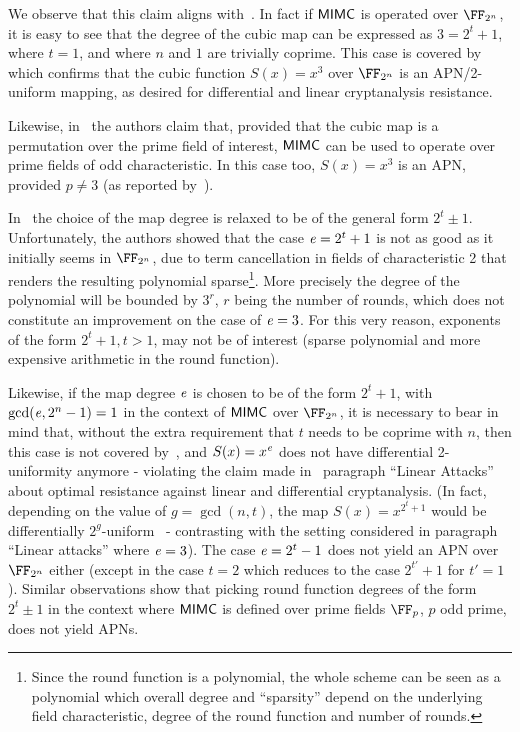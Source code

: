 We observe that this claim aligns with~\cite[Theorem 2]{DBLP:journals/tit/HellesethRS99}. In fact if $\mathsf{MIMC{}}$ is operated over $\FFx{2^n}$, it is easy to see that the degree of the cubic map can be expressed as $3 = 2^t + 1$, where $t = 1$, and where $n$ and $1$ are trivially coprime. This case is covered by~\cite[Theorem 2]{DBLP:journals/tit/HellesethRS99} which confirms that the cubic function $S(x) = x^3$ over $\FFx{2^n}$ is an APN/2-uniform mapping, as desired for differential and linear cryptanalysis resistance.

Likewise, in~\cite[Section 5.1]{albrecht2016mimc} the authors claim that, provided that the cubic map is a permutation over the prime field of interest, $\mathsf{MIMC{}}$ can be used to operate over prime fields of odd characteristic. In this case too, $S(x) = x^3$ is an APN, provided $p \neq 3$ (as reported by~\cite[Theorem 3, item 3]{DBLP:journals/tit/HellesethRS99}).

In~\cite[Section 5.3]{albrecht2016mimc} the choice of the map degree is relaxed to be of the general form $2^t \pm 1$. Unfortunately, the authors showed that the case $\mathit{e}{} = 2^t + 1$ is not as good as it initially seems in $\FFx{2^n}$, due to term cancellation in fields of characteristic 2 that renders the resulting polynomial sparse\footnote{Since the round function is a polynomial, the whole scheme can be seen as a polynomial which overall degree and ``sparsity'' depend on the underlying field characteristic, degree of the round function and number of rounds.}. More precisely the degree of the polynomial will be bounded by $3^r$, $r$ being the number of rounds, which does not constitute an improvement on the case of $\mathit{e}{} = 3$. For this very reason, exponents of the form $2^t + 1, t > 1$, may not be of interest (sparse polynomial and more expensive arithmetic in the round function).

Likewise, if the map degree $\mathit{e}{}$ is chosen to be of the form $2^t + 1$, with $\gcd(\mathit{e}{}, 2^n - 1) = 1$ in the context of $\mathsf{MIMC{}}$ over $\FFx{2^n}$, it is necessary to bear in mind that, without the extra requirement that $t$ needs to be coprime with $n$, then this case is not covered by~\cite[Theorem 2]{DBLP:journals/tit/HellesethRS99}, and $S(x) = x^{\mathit{e}}{}$ does not have differential 2-uniformity anymore - violating the claim made in~\cite[Section 4.2]{albrecht2016mimc} paragraph ``Linear Attacks'' about optimal resistance against linear and differential cryptanalysis. (In fact, depending on the value of $g = \gcd(n, t)$, the map $S(x) = x^{2^t + 1}$ would be differentially $2^g$-uniform~\cite{DBLP:conf/eurocrypt/Nyberg93} - contrasting with the setting considered in paragraph ``Linear attacks'' where $\mathit{e}{} = 3$).
The case $\mathit{e}{} = 2^t - 1$ does not yield an APN over $\FFx{2^n}$ either (except in the case $t = 2$ which reduces to the case $2^{t'} + 1$ for $t' = 1$). Similar observations show that picking round function degrees of the form $2^t \pm 1$ in the context where $\mathsf{MIMC{}}$ is defined over prime fields $\FFx{p}$, $p$ odd prime, does not yield APNs.

